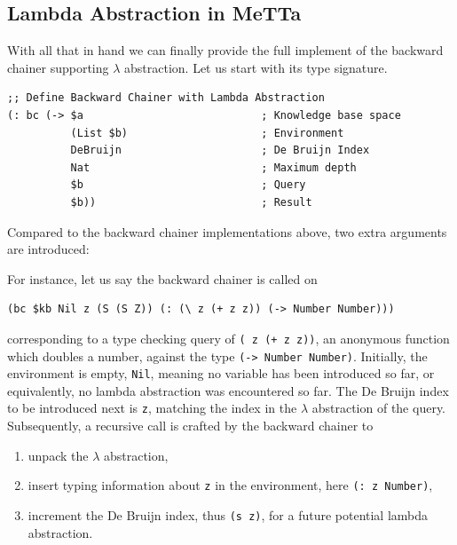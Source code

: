\documentclass[]{report}
\begin{document}
\subsection{Lambda Abstraction in MeTTa}
With all that in hand we can finally provide the full implement of the
backward chainer supporting $\lambda$ abstraction.  Let us start with
its type signature.
\begin{verbatim}
;; Define Backward Chainer with Lambda Abstraction
(: bc (-> $a                            ; Knowledge base space
          (List $b)                     ; Environment
          DeBruijn                      ; De Bruijn Index
          Nat                           ; Maximum depth
          $b                            ; Query
          $b))                          ; Result
\end{verbatim}
Compared to the backward chainer implementations above, two extra
arguments are introduced:
For instance, let us say the backward chainer is called on
\begin{verbatim}
(bc $kb Nil z (S (S Z)) (: (\ z (+ z z)) (-> Number Number)))
\end{verbatim}
corresponding to a type checking query of
\texttt{(\ z (+ z z))},  an anonymous function which
doubles a number, against the type \texttt{(-> Number Number)}.
Initially, the environment is empty, \texttt{Nil}, meaning no
variable has been introduced so far, or equivalently, no lambda
abstraction was encountered so far.  The De Bruijn index to be
introduced next is \texttt{z}, matching the index in the
$\lambda$ abstraction of the query.  Subsequently, a
recursive call is crafted by the backward chainer to
\begin{enumerate}
\item unpack the $\lambda$ abstraction,
\item insert typing information about \texttt{z} in the
  environment, here \texttt{(: z Number)},
\item increment the De Bruijn index, thus \texttt{(s z)},
  for a future potential lambda abstraction.
\end{enumerate}
\end{document}
